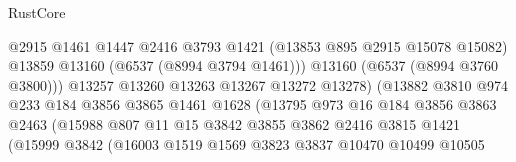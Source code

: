 \begin{lexlean}{RustCore}
\begin{coremodule}
                                          @2915
                                          @1461
                                          @1447
                                          @2416
                                          @3793
                                          @1421
                                          (@13853 @895 @2915 @15078 @15082)
                                          @13859
                                          @13160
                                          (@6537 (@8994 @3794 @1461)))
                                        @13160
                                        (@6537 (@8994 @3760 @3800)))
                                      @13257
                                      @13260
                                      @13263
                                      @13267
                                      @13272
                                      @13278)
                                    (@13882
                                      @3810
                                      @974
                                      @233
                                      @184
                                      @3856
                                      @3865
                                      @1461
                                      @1628
                                      (@13795
                                        @973
                                        @16
                                        @184
                                        @3856
                                        @3863
                                        @2463
                                        (@15988
                                          @807
                                          @11
                                          @15
                                          @3842
                                          @3855
                                          @3862
                                          @2416
                                          @3815
                                          @1421
                                          (@15999
                                            @3842
                                            (@16003
                                              @1519
                                              @1569
                                              @3823
                                              @3837
                                              @10470
                                              @10499
                                              @10505

\end{coremodule}
\end{lexlean}
